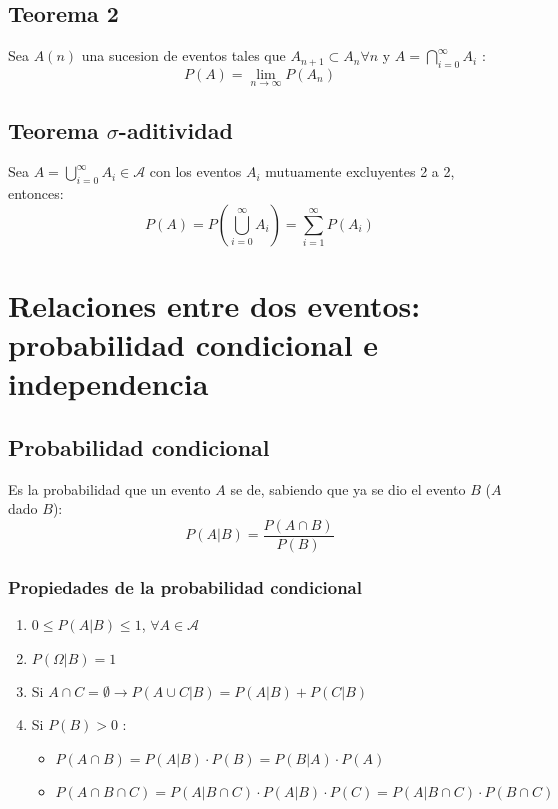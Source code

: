 \documentclass[titlepage,a4paper]{article}
\begin{document}
\subsection{Teorema 2}
Sea $A(n)$ una sucesion de eventos tales que $A_{n+1} \subset A_{n} \forall n$ y $A = \bigcap_{i=0}^{\infty} A_{i}$ :
\begin{equation*}
    P(A) = \lim_{n \to \infty } P(A_{n})
\end{equation*}

\subsection{Teorema $\sigma$-aditividad}
Sea $A = \bigcup_{i=0}^{\infty} A_{i} \in \mathcal{A} $ con los eventos $A_{i}$ mutuamente excluyentes 2 a 2, entonces:
\begin{equation*}
    P(A) = P(\bigcup_{i=0}^{\infty} A_{i}) = \sum_{i=1}^{\infty}P(A_{i})
\end{equation*}

\section{Relaciones entre dos eventos: probabilidad condicional e independencia}

\subsection{Probabilidad condicional}
Es la probabilidad que un evento $A$ se de, sabiendo que ya se dio el evento $B$ ($A$ dado $B$):
\begin{equation*}
    P(A|B) = \frac{P(A \cap B)}{P(B)}
\end{equation*}

\subsubsection*{Propiedades de la probabilidad condicional}
\begin{enumerate}
    \item $0 \leq P(A|B) \leq 1$, $\forall A \in \mathcal{A}$
    \item $P(\Omega|B) = 1$
    \item Si $A \cap C = \emptyset \rightarrow P(A \cup C | B) = P(A|B) + P(C|B)$ 
    \item Si $P(B) > 0$ :\begin{itemize}
        \item $P(A \cap B) = P(A|B)\cdot P(B) = P(B|A) \cdot P(A)$
        \item $P(A \cap B \cap C) = P(A|B \cap C) \cdot P(A|B) \cdot P(C) =P(A|B \cap C) \cdot P(B\cap C) $
    \end{itemize}
\end{enumerate}
\end{document}
